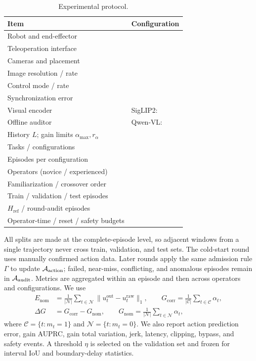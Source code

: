 \begin{table}[!t]
  \centering
  \caption{Experimental protocol.}
  \label{tab:protocol}
  \footnotesize
  \setlength{\tabcolsep}{4pt}
  \begin{tabularx}{\columnwidth}{@{}>{\raggedright\arraybackslash}p{}Y@{}}
    \toprule
    Item & Configuration \\
    \midrule
    Robot and end-effector & \\
    Teleoperation interface & \\
    Cameras and placement & \\
    Image resolution / rate & \\
    Control mode / rate & \\
    Synchronization error & \\
    Visual encoder & SigLIP2: \\
    Offline auditor & Qwen-VL: \\
    History $L$; gain limits $\alpha_{\max},r_\alpha$ & \\
    Tasks / configurations & \\
    Episodes per configuration & \\
    Operators (novice / experienced) & \\
    Familiarization / crossover order & \\
    Train / validation / test episodes & \\
    $H_{\mathrm{ref}}$ / round-audit episodes & \\
    Operator-time / reset / safety budgets & \\
    \bottomrule
  \end{tabularx}
\end{table}

All splits are made at the complete-episode level, so adjacent windows from a
single trajectory never cross train, validation, and test sets. The cold-start
round uses manually confirmed action data. Later rounds apply the same
admission rule $\Gamma$ to update $\mathcal{A}_{\mathrm{action}}$; failed, near-miss, conflicting,
and anomalous episodes remain in $\mathcal{A}_{\mathrm{audit}}$. Metrics are aggregated within an
episode and then across operators and configurations. We use
\begin{align}
  E_{\mathrm{nom}}&=\frac{1}{|\mathcal{N}|}\sum_{t\in\mathcal{N}}
    \|u^{\mathrm{out}}_t-u^{\mathrm{raw}}_t\|_1,\qquad
  G_{\mathrm{corr}}=\frac{1}{|\mathcal{C}|}\sum_{t\in\mathcal{C}}\alpha_t,\\
  \Delta G&=G_{\mathrm{corr}}-G_{\mathrm{nom}},\qquad
  G_{\mathrm{nom}}=\frac{1}{|\mathcal{N}|}\sum_{t\in\mathcal{N}}\alpha_t,
  \label{eq:exp_metrics}
\end{align}
where $\mathcal{C}=\{t:m_t=1\}$ and $\mathcal{N}=\{t:m_t=0\}$. We also
report action prediction error, gain AUPRC, gain total variation, jerk, latency,
clipping, bypass, and safety events. A threshold $\eta$ is selected on the
validation set and frozen for interval IoU and boundary-delay statistics.

